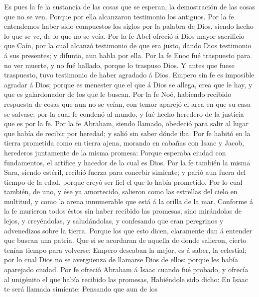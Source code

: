 Es pues la fe la sustancia de las cosas que se esperan, la
demostración de las cosas que no se ven.  Porque por ella
alcanzaron testimonio los antiguos.  Por la fe entendemos
haber sido compuestos los siglos por la palabra de Dios, siendo hecho lo
que se ve, de lo que no se veía.  Por la fe Abel ofreció á
Dios mayor sacrificio que Caín, por la cual alcanzó testimonio de que
era justo, dando Dios testimonio á sus presentes; y difunto, aun habla
por ella.  Por la fe Enoc fué traspuesto para no ver muerte,
y no fué hallado, porque lo traspuso Dios. Y antes que fuese traspuesto,
tuvo testimonio de haber agradado á Dios.  Empero sin fe es
imposible agradar á Dios; porque es menester que el que á Dios se
allega, crea que le hay, y que es galardonador de los que le buscan.
 Por la fe Noé, habiendo recibido respuesta de cosas que aun
no se veían, con temor aparejó el arca en que su casa se salvase: por la
cual fe condenó al mundo, y fué hecho heredero de la justicia que es por
la fe.  Por la fe Abraham, siendo llamado, obedeció para
salir al lugar que había de recibir por heredad; y salió sin saber dónde
iba.  Por fe habitó en la tierra prometida como en tierra
ajena, morando en cabañas con Isaac y Jacob, herederos juntamente de la
misma promesa:  Porque esperaba ciudad con fundamentos, el
artífice y hacedor de la cual es Dios.  Por la fe también
la misma Sara, siendo estéril, recibió fuerza para concebir simiente; y
parió aun fuera del tiempo de la edad, porque creyó ser fiel el que lo
había prometido.  Por lo cual también, de uno, y ése ya
amortecido, salieron como las estrellas del cielo en multitud, y como la
arena innumerable que está á la orilla de la mar.  Conforme
á la fe murieron todos éstos sin haber recibido las promesas, sino
mirándolas de lejos, y creyéndolas, y saludándolas, y confesando que
eran peregrinos y advenedizos sobre la tierra.  Porque los
que esto dicen, claramente dan á entender que buscan una patria.
 Que si se acordaran de aquella de donde salieron, cierto
tenían tiempo para volverse:  Empero deseaban la mejor, es
á saber, la celestial; por lo cual Dios no se avergüenza de llamarse
Dios de ellos: porque les había aparejado ciudad.  Por fe
ofreció Abraham á Isaac cuando fué probado, y ofrecía al unigénito el
que había recibido las promesas,  Habiéndole sido dicho: En
Isaac te será llamada simiente:  Pensando que aun de los
